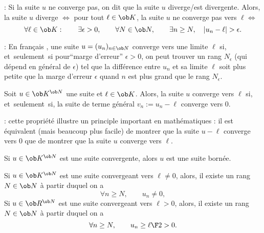 \Remarque : Si la suite $u$ ne converge pas, on dit que la suite $u$ diverge/est divergente. 
Alors, la suite $u$ diverge $\Leftrightarrow$ pour tout $\ell\in\ob K$, la suite $u$ ne converge pas vers $\ell\Leftrightarrow$
$$
\forall \ell\in\ob K: \qquad\exists\epsilon>0, \qquad \forall N\in\ob N,\qquad \exists n\ge N, \quad |u_n-\ell|> \epsilon.
$$

\Remarque : En fran\c cais , une suite $u=(u_n)_{n\in\ob N}$ converge vers une limite $\ell$ si, et~seulement~si pour``marge d'erreur'' $\epsilon> 0$, on peut trouver un rang $N_\epsilon$ (qui dépend en général de $\epsilon$) tel que la différence entre $u_n$ et sa limite $\ell$ soit plus petite que la marge d'erreur $\epsilon$ quand $n$ est plus grand que le rang $N_\epsilon$. 
\bigskip

{}
\bigskip

\Propriete []  Soit $u\in\ob K^{\ob N}$ une suite et $\ell\in\ob K$. Alors, la suite $u$ converge vers $\ell$ si, et~seulement~si, 
la suite de terme général $v_n:=u_n-\ell$ converge vers $0$. 
\bigskip

\Remarque : cette propriété illustre un principle important en mathématiques : il est équivalent (mais beaucoup plus facile) de montrer que la suite $u-\ell$ converge vers $0$ que de montrer que la suite $u$ converge vers $\ell$. 
\bigskip

\Propriete []  Si $u\in \ob K^{\ob N}$ est une suite convergente, alors $u$ est une suite bornée. 
\bigskip

\Propriete []  Si $u\in\ob K^{\ob N}$ est une suite convergeant vers $\ell\neq 0$, alors, il existe un rang $N\in\ob N$ à partir duquel on a 
$$
\forall n\ge N,\qquad u_n\neq0, 
$$
Si $u\in\ob R^{\ob N}$ est une suite convergeant vers $\ell> 0$, alors, il existe un rang $N\in\ob N$ à partir duquel on a 
$$
\forall n\ge N,\qquad u_n\ge{\ell\F 2}>0. 
$$

